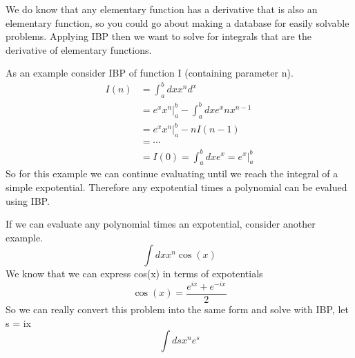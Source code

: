 \documentclass{article}
\newcommand{\be}{\begin{equation}}
\newcommand{\ee}{\end{equation}}
\begin{document}
We do know that any elementary function has a derivative that is also an elementary function, so you could go about making a database for easily solvable problems.
Applying IBP then we want to solve for integrals that are the derivative of elementary functions.

As an example consider IBP of function I (containing parameter n).
\be
\begin{split}
	I(n) &= \int_a^b dx x^n d^x\\
	&= e^x x^n \bigg |_a^b - \int_a^b dx e^x n x^{n-1} \\
	&= e^x x^n \bigg |_a^b - n I(n-1)\\
	&= \cdots \\
	&= I(0) = \int_a^b dx e^x = e^x \bigg |_a^b
\end{split}
\ee
So for this example we can continue evaluating until we reach the integral of a simple expotential.
Therefore any expotential times a polynomial can be evalued using IBP.

If we can evaluate any polynomial times an expotential, consider another example.
\be
\int dx x^n \cos(x)
\ee
We know that we can express cos(x) in terms of expotentials
\be
\cos(x) = \frac{e^{ix}+e^{-ix}}{2}
\ee
So we can really convert this problem into the same form and solve with IBP, let s = ix
\be
\int ds x^n e^s
\ee
\end{document}
